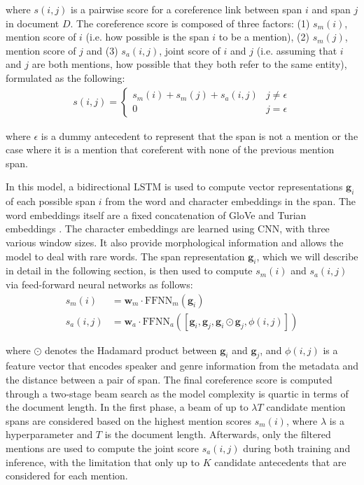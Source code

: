 \documentclass[11pt]{article}
\begin{document}
where $s(i,j)$ is a pairwise score for a coreference link between span $i$ and span $j$ in document $D$. The coreference score is composed of three factors: (1) $s_{m}(i)$, mention score of $i$ (i.e. how possible is the span $i$ to be a mention), (2) $s_{m}(j)$, mention score of $j$ and (3) $s_{a}(i,j)$, joint score of $i$ and $j$ (i.e. assuming that $i$ and $j$ are both mentions, how possible that they both refer to the same entity), formulated as the following:
\begin{align}
s(i, j) = \begin{cases}
s_{m}(i) + s_{m}(j) + s_{a}(i, j) & j \neq \epsilon \\
0 & j = \epsilon
\end{cases}
\end{align} 

where $\epsilon$ is a dummy antecedent to represent that the span is not a mention or the case where it is a mention that coreferent with none of the previous mention span.

In this model, a bidirectional LSTM \parencite{lstm} is used to compute vector representations $\pmb{g}_{i}$ of each possible span $i$ from the word and character embeddings in the span. The word embeddings itself are a fixed concatenation of GloVe \parencite{pennington2014glove} and Turian embeddings \parencite{turian-etal-2010-word}. The character embeddings are learned using CNN, with three various window sizes. It also provide morphological information and allows the model to deal with rare words. The span representation $\pmb{g}_{i}$, which we will describe in detail in the following section, is then used to compute $s_{m}(i)$ and $s_{a}(i, j)$ via feed-forward neural networks as follows:
\begin{align}
s_{m}(i) &= \pmb{w}_{m} \cdot \text{FFNN}_{m}(\pmb{g}_{i}) \\
s_{a}(i, j) &= \pmb{w}_{a} \cdot \text{FFNN}_{a}([\pmb{g}_{i}, \pmb{g}_{j}, \pmb{g}_{i} \odot \pmb{g}_{j}, \phi(i, j)])
\end{align}

where $\odot$ denotes the Hadamard product between $\pmb{g}_{i}$ and $\pmb{g}_{j}$, and $\phi(i, j)$ is a feature vector that encodes speaker and genre information from the metadata and the distance between a pair of span. The final coreference score is computed through a two-stage beam search as the model complexity is quartic in terms of the document length. In the first phase, a beam of up to $\lambda T$ candidate mention spans are considered based on the highest mention scores $s_{m}(i)$, where $\lambda$ is a hyperparameter and $T$ is the document length. Afterwards, only the filtered mentions are used to compute the joint score $s_{a}(i, j)$ during both training and inference, with the limitation that only up to $K$ candidate antecedents that are considered for each mention.
\end{document}
